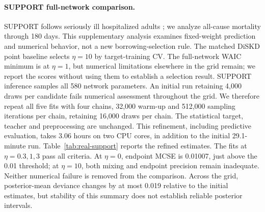 \documentclass{article} %
\begin{document}
\paragraph{SUPPORT full-network comparison.}
SUPPORT follows seriously ill hospitalized adults \citep{katzman2018deepsurv}; we analyze all-cause mortality through 180 days. This supplementary analysis examines fixed-weight prediction and numerical behavior, not a new borrowing-selection rule. The matched DiSKD point baseline selects $\eta=10$ by target-training CV. The full-network WAIC minimum is at $\eta=1$, but numerical limitations elsewhere in the grid remain; we report the scores without using them to establish a selection result.
SUPPORT inference samples all 580 network parameters. An initial run retaining 4,000 draws per candidate fails numerical assessment throughout the grid. We therefore repeat all five fits with four chains, 32,000 warm-up and 512,000 sampling iterations per chain, retaining 16,000 draws per chain. The statistical target, teacher and preprocessing are unchanged. This refinement, including predictive evaluation, takes 3.06 hours on two CPU cores, in addition to the initial 29.1-minute run. Table~\ref{tab:real-support} reports the refined estimates. The fits at $\eta=0.3,1,3$ pass all criteria. At $\eta=0$, endpoint MCSE is 0.01007, just above the 0.01 threshold; at $\eta=10$, both mixing and endpoint precision remain inadequate. Neither numerical failure is removed from the comparison. Across the grid, posterior-mean deviance changes by at most 0.019 relative to the initial estimates, but stability of this summary does not establish reliable posterior intervals.
\end{document}
